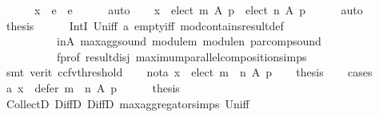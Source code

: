 \begin{isabellebody}
\ \ \ \ \ \ x\ {\isasymin}\ e{}\ {\isasymunion}\ e{}{\isachardoublequoteclose}\isanewline
\ \ \ \ \isamarkupfalse%
\ auto\isanewline
\ \ \isamarkupfalse%
\ {\isachardoublequoteopen}x\ {\isasymin}\ {\isacharparenleft}{\kern0pt}elect\ m\ A\ p{\isacharparenright}{\kern0pt}\ {\isasymunion}\ {\isacharparenleft}{\kern0pt}elect\ n\ A\ p{\isacharparenright}{\kern0pt}{\isachardoublequoteclose}\isanewline
\ \ \ \ \isamarkupfalse%
\ auto\isanewline
\ \ \isamarkupfalse%
\ {\isacharquery}{\kern0pt}thesis\isanewline
\ \ \ \ \isamarkupfalse%
\ IntI\ Un{\isacharunderscore}{\kern0pt}iff\ a{}\ empty{\isacharunderscore}{\kern0pt}iff\ mod{\isacharunderscore}{\kern0pt}contains{\isacharunderscore}{\kern0pt}result{\isacharunderscore}{\kern0pt}def\isanewline
\ \ \ \ \ \ \ \ \ \ in{\isacharunderscore}{\kern0pt}A\ max{\isacharunderscore}{\kern0pt}agg{\isacharunderscore}{\kern0pt}sound\ module{\isacharunderscore}{\kern0pt}m\ module{\isacharunderscore}{\kern0pt}n\ par{\isacharunderscore}{\kern0pt}comp{\isacharunderscore}{\kern0pt}sound\isanewline
\ \ \ \ \ \ \ \ \ \ f{\isacharunderscore}{\kern0pt}prof\ result{\isacharunderscore}{\kern0pt}disj\ maximum{\isacharunderscore}{\kern0pt}parallel{\isacharunderscore}{\kern0pt}composition{\isachardot}{\kern0pt}simps\isanewline
\ \ \ \ \isamarkupfalse%
\ {\isacharparenleft}{\kern0pt}smt\ {\isacharparenleft}{\kern0pt}verit{\isacharcomma}{\kern0pt}\ ccfv{\isacharunderscore}{\kern0pt}threshold{\isacharparenright}{\kern0pt}{\isacharparenright}{\kern0pt}\isanewline
{}\isamarkupfalse%
\isanewline
\ \ \isamarkupfalse%
\ not{\isacharunderscore}{\kern0pt}a{}{\isacharcolon}{\kern0pt}\ {\isachardoublequoteopen}x\ {\isasymnotin}\ elect\ {\isacharparenleft}{\kern0pt}m\ {\isasymparallel}\isactrlsub {\isasymup}\ n{\isacharparenright}{\kern0pt}\ A\ p{\isachardoublequoteclose}\isanewline
\ \ \isamarkupfalse%
\ {\isacharquery}{\kern0pt}thesis\isanewline
\ \ \isamarkupfalse%
\ cases\isanewline
\ \ \ \ \isamarkupfalse%
\ a{}{\isacharcolon}{\kern0pt}\ {\isachardoublequoteopen}x\ {\isasymin}\ defer\ {\isacharparenleft}{\kern0pt}m\ {\isasymparallel}\isactrlsub {\isasymup}\ n{\isacharparenright}{\kern0pt}\ A\ p{\isachardoublequoteclose}\isanewline
\ \ \ \ \isamarkupfalse%
\ {\isacharquery}{\kern0pt}thesis\isanewline
\ \ \ \ \ \ \isamarkupfalse%
\ CollectD\ DiffD{}\ DiffD{}\ max{\isacharunderscore}{\kern0pt}aggregator{\isachardot}{\kern0pt}simps\ Un{\isacharunderscore}{\kern0pt}iff\isanewline

\end{isabellebody}
